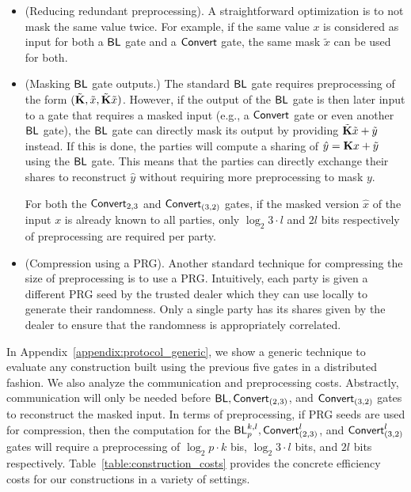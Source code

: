 \begin{itemize}

  \item (Reducing redundant preprocessing).
  A straightforward optimization is to not mask the same value twice. For example, if the same value $x$ is considered as input for both a $\textnormal{\textsf{BL}}$ gate and a $\textnormal{\textsf{Convert}}$ gate, the same mask $\tilde{x}$ can be used for both. 

  \item (Masking $\textnormal{\textsf{BL}}$ gate outputs.)
  The standard $\textnormal{\textsf{BL}}$ gate requires preprocessing of the form $(\tilde{\mat{K}}, \tilde{x}, \tilde{\mat{K}}\tilde{x})$. However, if the output of the $\textnormal{\textsf{BL}}$ gate is then later input to a gate that requires a masked input (e.g., a $\textnormal{\textsf{Convert}}$ gate or even another $\textnormal{\textsf{BL}}$ gate), the $\textnormal{\textsf{BL}}$ gate can directly mask its output by providing $\tilde{\mat{K}}\tilde{x} + \tilde{y}$ instead. If this is done, the parties will compute a sharing of $\hat{y} = \mat{K}x + \tilde{y}$ using the $\textnormal{\textsf{BL}}$ gate. This means that the parties can directly exchange their shares to reconstruct $\hat{y}$ without requiring more preprocessing to mask $y$.

  For both the $\textnormal{\textsf{Convert}}_{2,3}$ and $\textnormal{\textsf{Convert}}_{(3,2)}$ gates, if the masked version $\hat{x}$ of the input $x$ is already known to all parties, only $\log_2{3} \cdot l$ and $2l$ bits respectively of preprocessing are required per party. 

 
  \item (Compression using a PRG).
  Another standard technique for compressing the size of preprocessing is to use a PRG. Intuitively, each party is given a different PRG seed by the trusted dealer which they can use locally to generate their randomness. Only a single party has its shares given by the dealer to ensure that the randomness is appropriately correlated. 


\end{itemize}
\else
\iffull\else\noindent In Appendix~\ref{appendix:protocol_generic}, we show a generic technique to evaluate any construction built using the previous five gates in a distributed fashion. We also analyze the communication and preprocessing costs. Abstractly, communication will only be needed before $\textnormal{\textsf{BL}}, \textnormal{\textsf{Convert}}_{(2,3)}$, and $\textnormal{\textsf{Convert}}_{(3,2)}$ gates to reconstruct the masked input. In terms of preprocessing, if PRG seeds are used for compression, then the computation for the $\textnormal{\textsf{BL}}_p^{k,l}, \textnormal{\textsf{Convert}}^l_{(2,3)}$, and $\textnormal{\textsf{Convert}}^l_{(3,2)}$ gates will require a preprocessing of $\log_2{p} \cdot k$ bis, $\log_2{3} \cdot l$ bits, and $2l$ bits respectively. Table~\ref{table:construction_costs} provides the concrete efficiency costs for our constructions in a variety of settings.
\fi


